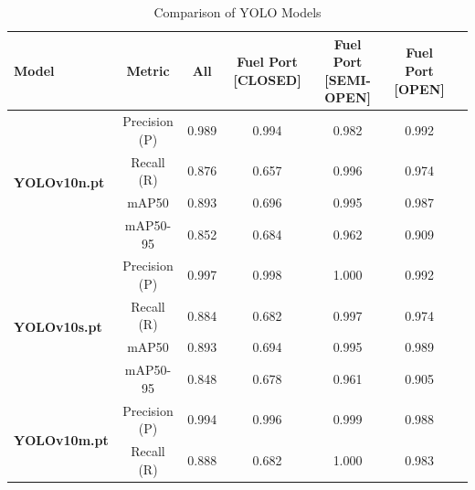 \documentclass[12pt,oneside]{book} %
\begin{document}
\begin{table}[h!]
    \centering
    \caption{Comparison of YOLO Models}
    \begin{adjustbox}{max width=\textwidth}
        \begin{tabular}{lcccccc}
            \toprule
            \textbf{Model}                        & \textbf{Metric} & \textbf{All} & \textbf{Fuel Port [CLOSED]} & \textbf{Fuel Port [SEMI-OPEN]} & \textbf{Fuel Port [OPEN]} \\
            \midrule
            \multirow{4}{*}{\textbf{YOLOv10n.pt}} & Precision (P)   & 0.989        & 0.994                       & 0.982                          & 0.992                     \\
                                                  & Recall (R)      & 0.876        & 0.657                       & 0.996                          & 0.974                     \\
                                                  & mAP50           & 0.893        & 0.696                       & 0.995                          & 0.987                     \\
                                                  & mAP50-95        & 0.852        & 0.684                       & 0.962                          & 0.909                     \\
            \midrule
            \multirow{4}{*}{\textbf{YOLOv10s.pt}} & Precision (P)   & 0.997        & 0.998                       & 1.000                          & 0.992                     \\
                                                  & Recall (R)      & 0.884        & 0.682                       & 0.997                          & 0.974                     \\
                                                  & mAP50           & 0.893        & 0.694                       & 0.995                          & 0.989                     \\
                                                  & mAP50-95        & 0.848        & 0.678                       & 0.961                          & 0.905                     \\
            \midrule
            \multirow{4}{*}{\textbf{YOLOv10m.pt}} & Precision (P)   & 0.994        & 0.996                       & 0.999                          & 0.988                     \\
                                                  & Recall (R)      & 0.888        & 0.682                       & 1.000                          & 0.983                     \\

\end{tabular}
\end{adjustbox}
\end{table}
\end{document}
